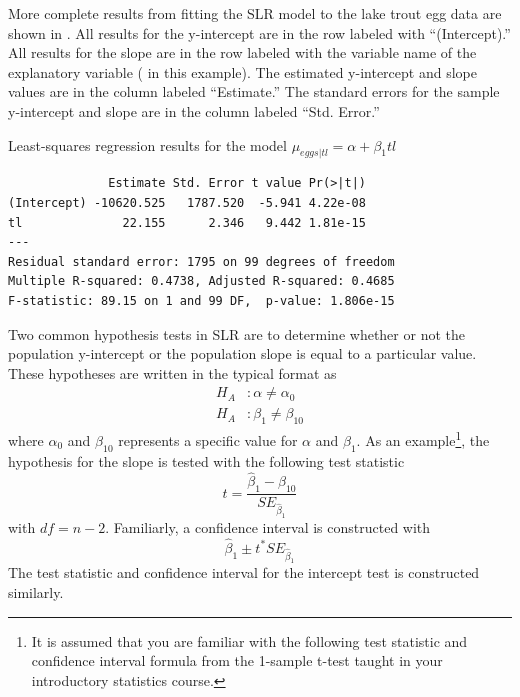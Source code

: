 \documentclass[10pt,openany]{book}\usepackage[]{graphicx}\usepackage[]{color}
\makeatletter
\newenvironment{kframe}{%
 \def\at@end@of@kframe{}%
 \ifinner\ifhmode%
  \def\at@end@of@kframe{\end{minipage}}%
  \begin{minipage}{\columnwidth}%
 \fi\fi%
 \def\FrameCommand##1{\hskip\@totalleftmargin \hskip-\fboxsep
 \colorbox{shadecolor}{##1}\hskip-\fboxsep
     \hskip-\linewidth \hskip-\@totalleftmargin \hskip\columnwidth}%
 \MakeFramed {\advance\hsize-\width
   \@totalleftmargin\z@ \linewidth\hsize
   \@setminipage}}%
 {\par\unskip\endMakeFramed%
 \at@end@of@kframe}
\newenvironment{knitrout}{}{} %
\makeatother
\begin{document}

More complete results from fitting the SLR model to the lake trout egg data are shown in  .  All results for the y-intercept are in the row labeled with ``(Intercept).''  All results for the slope are in the row labeled with the variable name of the explanatory variable ( in this example).  The estimated y-intercept and slope values are in the column labeled ``Estimate.''  The standard errors for the sample y-intercept and slope are in the column labeled ``Std. Error.''

\begin{table}[h]
  \centering
  \caption{Least-squares regression results for the model $\mu_{eggs|tl} = \alpha + \beta_{1}tl$}\label{tab:SLRLTResults1}
\begin{knitrout}
\color{fgcolor}\begin{kframe}
\begin{verbatim}
              Estimate Std. Error t value Pr(>|t|)
(Intercept) -10620.525   1787.520  -5.941 4.22e-08
tl              22.155      2.346   9.442 1.81e-15
---
Residual standard error: 1795 on 99 degrees of freedom
Multiple R-squared: 0.4738,	Adjusted R-squared: 0.4685 
F-statistic: 89.15 on 1 and 99 DF,  p-value: 1.806e-15 
\end{verbatim}
\end{kframe}
\end{knitrout}
\end{table}

Two common hypothesis tests in SLR are to determine whether or not the population y-intercept or the population slope is equal to a particular value.  These hypotheses are written in the typical format as
\[ \begin{split}
H_{A}&: \alpha \neq \alpha_{0} \\
H_{A}&: \beta_{1} \neq \beta_{10}
\end{split} \]
where $\alpha_{0}$ and $\beta_{10}$ represents a specific value for $\alpha$ and $\beta_{1}$.  As an example\footnote{It is assumed that you are familiar with the following test statistic and confidence interval formula from the 1-sample t-test taught in your introductory statistics course.}, the hypothesis for the slope is tested with the following test statistic
\begin{equation}\label{eqn:tTestStat}
  t = \frac{\hat{\beta}_{1}-\beta_{10}}{SE_{\hat{\beta}_{1}}}
\end{equation}
with $df=n-2$.  Familiarly, a confidence interval is constructed with
\[ \hat{\beta}_{1} \pm t^{*}SE_{\hat{\beta}_{1}} \]
The test statistic and confidence interval for the intercept test is constructed similarly.
\end{document}
